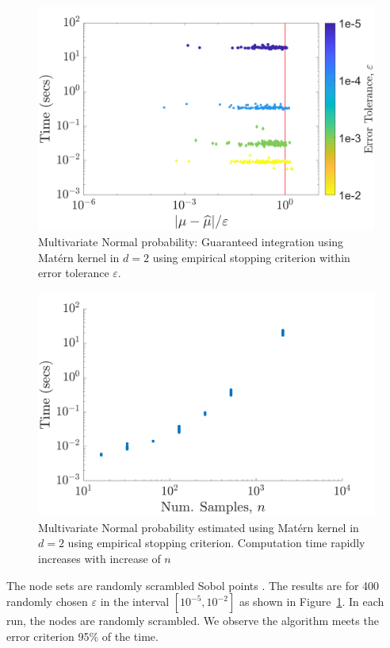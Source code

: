 \documentclass{iitthesis}          %
\newcommand\figref{Figure~\ref}
\begin{document}
\begin{figure}[h]
	\centering
	\includegraphics[width=0.9\linewidth]{MVN_guaranteed_time_Matern_d2_2018-Aug-31}
	\caption{Multivariate Normal probability: Guaranteed integration using Mat\'ern kernel in $d=2$ using empirical stopping criterion within error tolerance $\varepsilon$.}
	\label{fig:MVN_Metern_d2b2}
\end{figure}
\begin{figure}[h]
	\centering
	\includegraphics[width=0.9\linewidth]{MVN_rapid_n_vs_time_Matern_d2_2018-Aug-31}
	\caption{Multivariate Normal probability estimated using Mat\'ern kernel in $d=2$ using empirical stopping criterion. Computation time rapidly increases with increase of $n$}
	\label{fig:MVN_Metern_d2b2_time_growth}
\end{figure}
The node sets are randomly scrambled Sobol points \cite{DicEtal14a,DicPil10a}.  The results are for 400 randomly chosen $\varepsilon$ in the interval $[10^{-5}, 10^{-2}]$ as shown in \figref{fig:MVN_Metern_d2b2}. In each run, the nodes are randomly scrambled.  We  observe the algorithm meets the error criterion 95\% of the time.
\end{document}
